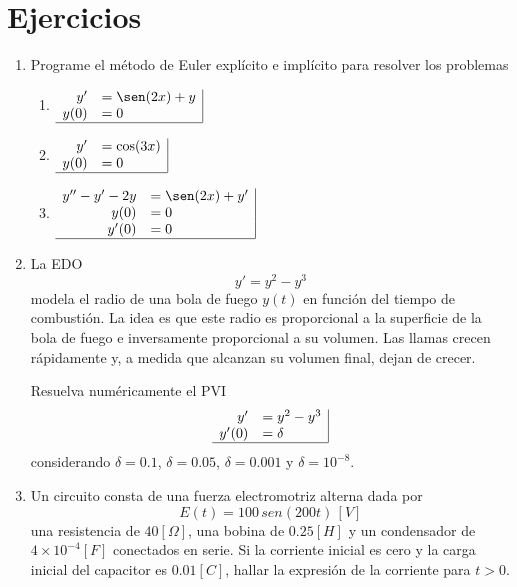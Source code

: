 \documentclass[letter,11pt]{article}
\begin{document}
\section{Ejercicios}
\begin{enumerate}
\item Programe el m\'etodo de Euler expl\'icito e impl\'icito para resolver los problemas
\begin{multicols}{2}
\begin{enumerate}
\item
$\begin{array}{rl|}
y'	&=\sen(2x)+y\\
y(0) &=0\\ \hline
\end{array}$
\item
$\begin{array}{rl|}
y'	&=\cos(3x)\\
y(0)&=0\\ \hline
\end{array}$
\item
$\begin{array}{rl|}
y''-y'-2y	&=\sen(2x)+y'\\
y(0)&=0\\
y'(0)&=0\\ \hline
\end{array}$
\end{enumerate}
\end{multicols}

\item La EDO
$$
y'=y^2-y^3
$$
modela el radio de una bola de fuego $y(t)$ en funci\'on del tiempo de combusti\'on. La idea es que este radio es proporcional a la superficie de la bola de fuego e inversamente proporcional a su volumen. Las llamas crecen r\'apidamente y, a medida que alcanzan su volumen final, dejan de crecer. 

Resuelva num\'ericamente el PVI
$$
\begin{array}{rl|}
y'  &=y^2-y^3 \\
y'(0) & = \delta \\ \hline
\end{array}
$$
considerando $\delta=0.1$, $\delta=0.05$, $\delta=0.001$ y $\delta=10 ^{-8}$.

\item Un circuito consta de una fuerza electromotriz alterna dada por
$$
E(t)=100\,sen(200t) \,[V]
$$
una resistencia de $40[\Omega]$, una bobina de $0.25[H]$ y un condensador de $4\times 10^{-4}[F]$ conectados en serie. Si la corriente inicial es cero y la carga inicial del capacitor es $0.01[C]$, hallar la expresi\'on de la corriente para $t>0$.


\end{enumerate}
\end{document}
